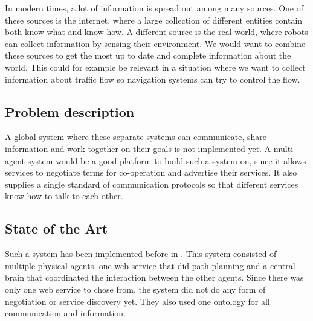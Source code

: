 In modern times, a lot of information is spread out among many sources. One
of these sources is the internet, where a large collection of different
entities contain both know-what and know-how.  A different source is the
real world, where robots can collect information by sensing their
environment. We would want to combine these sources to get the most up to
date and complete information about the world. This could for example be
relevant in a situation where we want to collect information about traffic
flow so navigation systems can try to control the flow.

\subsection{Problem description} 

A global system where these separate systems can communicate, share information
and work together on their goals is not implemented yet. A multi-agent system
would be a good platform to build such a system on, since it allows services to
negotiate terms for co-operation and advertise their services. It also supplies
a single standard of communication protocols so that different services know
how to talk to each other.


\subsection{State of the Art} 

Such a system has been implemented before in \cite{intframe}. This system
consisted of multiple physical agents, one web service that did path planning
and a central brain that coordinated the interaction between the other agents.
Since there was only one web service to chose from, the system did not do
any form of negotiation or service discovery yet. They also used one
ontology for all communication and information.

